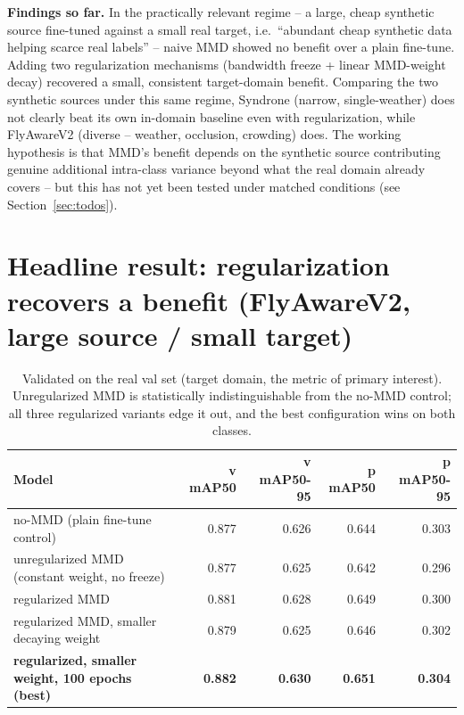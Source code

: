 \documentclass[11pt]{article}
\begin{document}
\textbf{Findings so far.} In the practically relevant regime -- a large, cheap synthetic
source fine-tuned against a small real target, i.e.\ ``abundant cheap synthetic data helping
scarce real labels'' -- naive MMD showed no benefit over a plain fine-tune. Adding two
regularization mechanisms (bandwidth freeze + linear MMD-weight decay) recovered a small,
consistent target-domain benefit. Comparing the two synthetic sources under this same regime,
Syndrone (narrow, single-weather) does not clearly beat its own in-domain baseline even with
regularization, while FlyAwareV2 (diverse -- weather, occlusion, crowding) does. The working
hypothesis is that MMD's benefit depends on the synthetic source contributing genuine
additional intra-class variance beyond what the real domain already covers -- but this has not
yet been tested under matched conditions (see Section~\ref{sec:todos}).

\section{Headline result: regularization recovers a benefit (FlyAwareV2, large source / small
target)}

\begin{table}[h!]
    \centering
    \begin{tabular}{lrrrr}
        \toprule
        Model & v mAP50 & v mAP50-95 & p mAP50 & p mAP50-95 \\
        \midrule
        no-MMD (plain fine-tune control) & 0.877 & 0.626 & 0.644 & 0.303 \\
        unregularized MMD (constant weight, no freeze) & 0.877 & 0.625 & 0.642 & 0.296 \\
        regularized MMD & 0.881 & 0.628 & 0.649 & 0.300 \\
        regularized MMD, smaller decaying weight & 0.879 & 0.625 & 0.646 & 0.302 \\
        \textbf{regularized, smaller weight, 100 epochs (best)} & \textbf{0.882} & \textbf{0.630} & \textbf{0.651} & \textbf{0.304} \\
        \bottomrule
    \end{tabular}
    \caption{Validated on the real val set (target domain, the metric of primary interest).
    Unregularized MMD is statistically indistinguishable from the no-MMD control; all three
    regularized variants edge it out, and the best configuration wins on both classes.}
\end{table}
\end{document}

